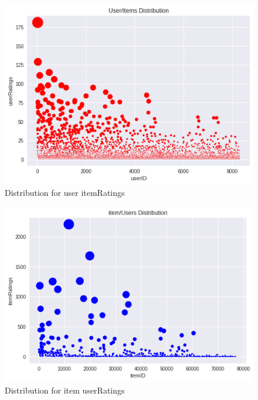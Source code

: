 \documentclass[letterpaper, 10 pt, conference]{ieeeconf}  %
\begin{document}
\begin{enumerate}
\begin{figure}[h]
            \includegraphics[scale=0.4]{User-item_distribution.png}
            \centering
            \caption{Distribution for user itemRatings}
            \label{fig:user-distribution}
            
        \end{figure}
        
        \begin{figure}[h]
            
            \includegraphics[scale=0.4]{Item-user_distribution.png}
            \centering
            \caption{Distribution for item userRatings}
            \label{fig:item-distribution}
            
        \end{figure}
    
    
\end{enumerate}
\end{document}
